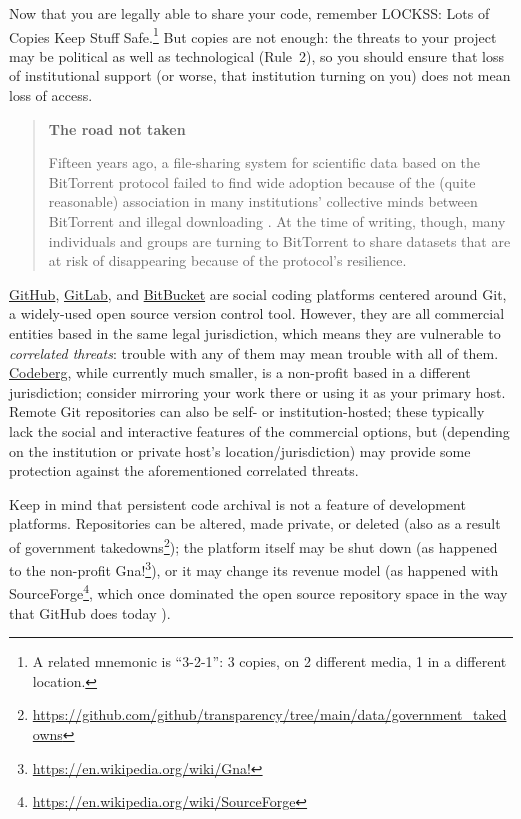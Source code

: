 \documentclass[10pt,letterpaper]{article}
\begin{document}
Now that you are legally able to share your code, remember LOCKSS: Lots of Copies Keep Stuff Safe.\footnote{A related mnemonic is ``3-2-1'': 3 copies, on 2 different media, 1 in a different location.}
But copies are not enough:
the threats to your project may be political as well as technological (Rule~2),
so you should ensure that loss of institutional support
(or worse, that institution turning on you)
does not mean loss of access.

\begin{quote}
  \noindent
  \textbf{The road not taken}

  Fifteen years ago,
  a file-sharing system for scientific data based on the BitTorrent protocol
  failed to find wide adoption because of the (quite reasonable) association in many institutions' collective minds
  between BitTorrent and illegal downloading \cite{Langille2010}.
  At the time of writing,
  though,
  many individuals and groups are turning to BitTorrent to share datasets that are at risk of disappearing
  because of the protocol's resilience.
\end{quote}

\href{https://github.com/}{GitHub},
\href{https://gitlab.com/}{GitLab},
and \href{https://bitbucket.org/}{BitBucket}
are social coding platforms centered around Git,
a widely-used open source version control tool.
However,
they are all commercial entities based in the same legal jurisdiction,
which means they are vulnerable to \emph{correlated threats}:
trouble with any of them may mean trouble with all of them.
\href{https://codeberg.org/}{Codeberg},
while currently much smaller,
is a non-profit based in a different jurisdiction;
consider mirroring your work there or using it as your primary host.
Remote Git repositories can also be self- or institution-hosted;
these typically lack the social and interactive features of the commercial options,
but (depending on the institution or private host's location/jurisdiction) may provide some protection against the aforementioned correlated threats.

Keep in mind that persistent code archival is not a feature of development platforms.
Repositories can be altered,
made private,
or deleted
(also as a result of government takedowns\footnote{\url{https://github.com/github/transparency/tree/main/data/government_takedowns}});
the platform itself may be shut down
(as happened to the non-profit Gna!\footnote{\url{https://en.wikipedia.org/wiki/Gna!}}),
or it may change its revenue model
(as happened with SourceForge\footnote{\url{https://en.wikipedia.org/wiki/SourceForge}},
which once dominated the open source repository space in the way that GitHub does today \cite{Tamburri2020}).
\end{document}
